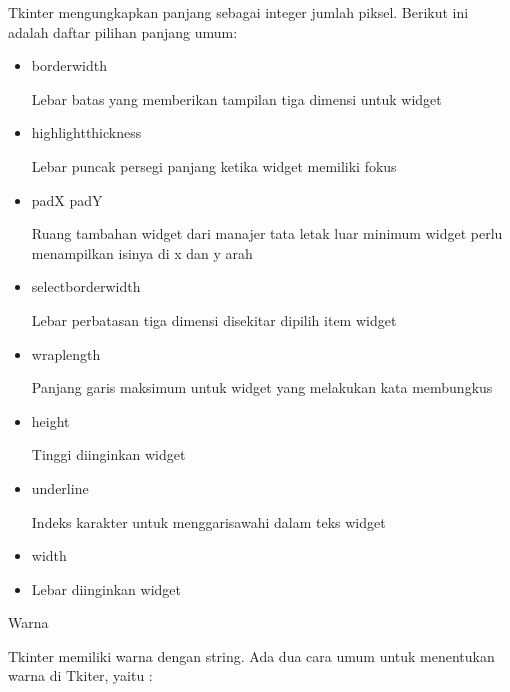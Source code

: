 \documentclass{wileySix}
\begin{document}
\begin{myEnumerate}
{\begin{myEnumerate}
	
	
	
	\hspace*{0.5in} \vspace{12pt}
	\hspace*{0.5in} Tkinter mengungkapkan panjang sebagai integer jumlah piksel. Berikut ini adalah daftar pilihan panjang umum: \par
	\noindent 
	\begin{itemize}
		\item borderwidth \par
		Lebar batas yang memberikan tampilan tiga dimensi untuk widget \par
		\noindent 
		\item highlightthickness \par
		Lebar puncak persegi panjang ketika widget memiliki fokus \par
		\noindent 
		\item padX padY \par
		Ruang tambahan widget dari manajer tata letak luar minimum widget perlu menampilkan isinya di x dan y arah \par
		\noindent 
		\item selectborderwidth \par
		Lebar perbatasan tiga dimensi disekitar dipilih item widget \par
		\noindent 
		\item wraplength \par
		Panjang garis maksimum untuk widget yang melakukan kata membungkus \par
		\noindent 
		\item height \par
		Tinggi diinginkan widget \par
		\noindent 
		\item underline \par
		Indeks karakter untuk menggarisawahi dalam teks widget  \par
		\noindent 
		\item width \par
		\noindent 
		\item Lebar diinginkan widget\end{itemize}
	\par
	\noindent 
	\item Warna \par
	\noindent 
	Tkinter memiliki warna dengan string. Ada dua cara umum untuk menentukan warna di Tkiter, yaitu : \par

\end{myEnumerate}}
\end{myEnumerate}
\end{document}
